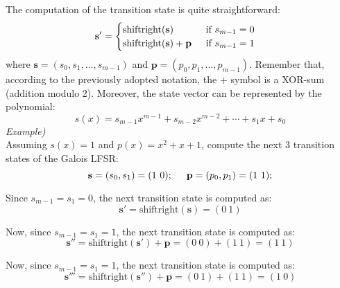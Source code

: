 The computation of the transition state is quite straightforward:
\begin{equation*}
    \textbf{s}'=
    \begin{cases}
      \text{shiftright}(\textbf{s})\ \ \ \ \ \ \ \ \ \ \text{if}\ s_{m-1}=0\\
      \text{shiftright}(\textbf{s})+\textbf{p}\ \ \ \ \hspace{0.05cm}\text{if}\ s_{m-1}=1
    \end{cases}
\end{equation*}
where $\textbf{s}=(s_0,s_1,...,s_{m-1})$ and $\textbf{p}=(p_0,p_1,...,p_{m-1})$. Remember that, according to the previously adopted notation, the + symbol is a XOR-sum (addition modulo 2). Moreover, the state vector can be represented by the polynomial:
$$s(x)=s_{m-1}x^{m-1}+s_{m-2}x^{m-2}+\cdots+s_1x+s_0$$
\textit{Example)}\\

Assuming $s(x)=1$ and $p(x)=x^2+x+1$, compute the next 3 transition states of the Galois LFSR:
$$\textbf{s}=(s_0,s_1)=(1\ 0);\hspace{0.5cm}\textbf{p}=(p_0,p_1)=(1\ 1);$$

Since $s_{m-1}=s_{1}=0$, the next transition state is computed as:
$$\textbf{s}'=\text{shiftright}(\textbf{s})=(0\ 1)$$

Now, since $s_{m-1}=s_{1}=1$, the next transition state is computed as:
$$\textbf{s}''=\text{shiftright}(\textbf{s}')+\textbf{p}=(0\ 0)+(1\ 1)=(1\ 1)$$

Now, since $s_{m-1}=s_{1}=1$, the next transition state is computed as:
$$\textbf{s}'''=\text{shiftright}(\textbf{s}'')+\textbf{p}=(0\ 1)+(1\ 1)=(1\ 0)$$

